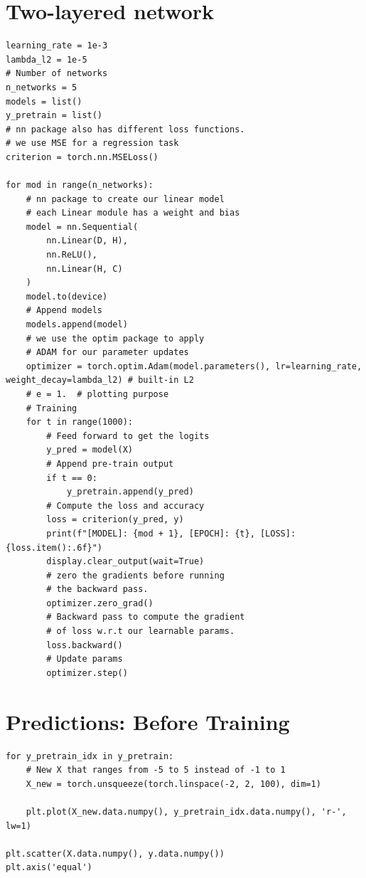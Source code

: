         \section{Two-layered network}
        \begin{verbatim}
learning_rate = 1e-3
lambda_l2 = 1e-5
# Number of networks
n_networks = 5
models = list()
y_pretrain = list()
# nn package also has different loss functions.
# we use MSE for a regression task
criterion = torch.nn.MSELoss()

for mod in range(n_networks):
    # nn package to create our linear model
    # each Linear module has a weight and bias
    model = nn.Sequential(
        nn.Linear(D, H),
        nn.ReLU(),
        nn.Linear(H, C)
    )
    model.to(device)
    # Append models
    models.append(model)
    # we use the optim package to apply
    # ADAM for our parameter updates
    optimizer = torch.optim.Adam(model.parameters(), lr=learning_rate, weight_decay=lambda_l2) # built-in L2
    # e = 1.  # plotting purpose
    # Training
    for t in range(1000):
        # Feed forward to get the logits
        y_pred = model(X)     
        # Append pre-train output
        if t == 0:
            y_pretrain.append(y_pred)
        # Compute the loss and accuracy
        loss = criterion(y_pred, y)
        print(f"[MODEL]: {mod + 1}, [EPOCH]: {t}, [LOSS]: {loss.item():.6f}")
        display.clear_output(wait=True)
        # zero the gradients before running
        # the backward pass.
        optimizer.zero_grad()
        # Backward pass to compute the gradient
        # of loss w.r.t our learnable params. 
        loss.backward()
        # Update params
        optimizer.step()        
        \end{verbatim}
        
        \section{Predictions: Before Training}
         \begin{verbatim}
for y_pretrain_idx in y_pretrain:
    # New X that ranges from -5 to 5 instead of -1 to 1
    X_new = torch.unsqueeze(torch.linspace(-2, 2, 100), dim=1)
        
    plt.plot(X_new.data.numpy(), y_pretrain_idx.data.numpy(), 'r-', lw=1)

plt.scatter(X.data.numpy(), y.data.numpy())
plt.axis('equal')
        \end{verbatim}

